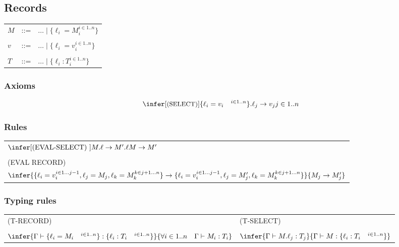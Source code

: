 \documentclass[11pt]{article}
\newcommand{\inferr}[3]{\ensuremath{\infer[\text{\small{(#1)}}]{#2}{#3}}}
\newcommand{\type}[2]{\ensuremath{ #1 : #2 }}
\newcommand{\rec}[1]{\ensuremath{ \{ #1 \} }}
\newcommand{\sel}[2]{\ensuremath{ #1 . #2 }}
\begin{document}
\subsection*{Records}
\label{sec:org1e79f67}

\begin{center}
\begin{tabular}{lcl}
\(M\) & ::= & \(\dots \mid \rec{\ell_i = M_i ^{i \in 1..n}}\)\\
 &  & \\
\(v\) & ::= & \(\dots \mid \rec{\ell_i = v_i ^{i \in 1..n}}\)\\
 &  & \\
\(T\) & ::= & \(\dots \mid \rec{\ell_i : T_i ^{i \in 1..n}}\)\\
\end{tabular}

\end{center}

\subsubsection*{Axioms}
\label{sec:org724ab5d}
\[\inferr{SELECT}{\sel{\rec{\ell_i = v_i \quad^{i \in
    1..n}}}{\ell_j} \to v_j}{j\in 1..n}\]

\subsubsection*{Rules}
\label{sec:org3432229}
\begin{center}
\begin{tabular}{l}
\(\infer[\text{(EVAL-SELECT) }]{\sel{M}{\ell} \to \sel{M'}{\ell}} {M\to M'}\)\\
\\
(EVAL RECORD)\\
\(\infer{\rec{\ell_i = v_i ^{i\in 1\dots j-1}, \ell_j = M_j, \ell_k = M_k^{k \in j+1 \dots n}} \to \rec{\ell_i = v_i ^{i\in 1\dots j-1}, \ell_j = M_j', \ell_k = M_k^{k \in j+1 \dots n}}}{M_j \to M_j'}\)\\
\end{tabular}

\end{center}

\subsubsection*{Typing rules}
\label{sec:orgc5c1e22}
\begin{center}
\begin{tabular}{ll}
(T-RECORD) & (T-SELECT)\\
 & \\
\(\infer{\Gamma\vdash\type{\rec{\ell_i = M_i\quad ^{i\in 1 .. n}}}{\rec{\type{\ell_i}{T_i}\quad^{i\in 1..n}}}}{\forall i \in 1 .. n \quad \Gamma \vdash M_i : T_i}\) & \(\infer{\Gamma\vdash \type{M.\ell_j}{T_j}}{\Gamma\vdash \type{M}{\rec{\type{\ell_i}{T_i}\quad^{i \in 1..n}}}}\)\\
\end{tabular}

\end{center}
\end{document}
